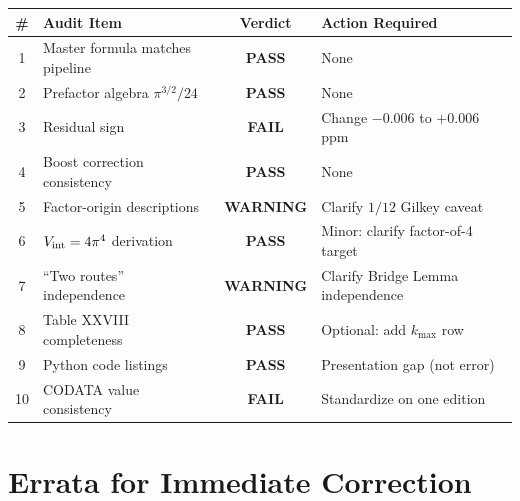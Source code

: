 \documentclass[11pt]{article}
\newcommand{\PASS}{\textcolor{pass}{\textbf{PASS}}}
\newcommand{\FAIL}{\textcolor{fail}{\textbf{FAIL}}}
\newcommand{\WARN}{\textcolor{warn}{\textbf{WARNING}}}
\begin{document}
\begin{center}
\renewcommand{\arraystretch}{1.4}
\begin{tabular}{clcl}
\toprule
\# & Audit Item & Verdict & Action Required \\
\midrule
1 & Master formula matches pipeline & \PASS & None \\
2 & Prefactor algebra $\pi^{3/2}/24$ & \PASS & None \\
3 & Residual sign & \FAIL & Change $-0.006$ to $+0.006$ ppm \\
4 & Boost correction consistency & \PASS & None \\
5 & Factor-origin descriptions & \WARN & Clarify $1/12$ Gilkey caveat \\
6 & $V_{\rm int} = 4\pi^4$ derivation & \PASS & Minor: clarify factor-of-4 target \\
7 & ``Two routes'' independence & \WARN & Clarify Bridge Lemma independence \\
8 & Table XXVIII completeness & \PASS & Optional: add $k_{\max}$ row \\
9 & Python code listings & \PASS & Presentation gap (not error) \\
10 & CODATA value consistency & \FAIL & Standardize on one edition \\
\bottomrule
\end{tabular}
\end{center}

\section{Errata for Immediate Correction}
\end{document}
